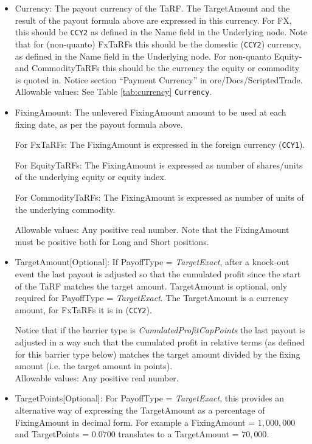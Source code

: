 \begin{itemize}
    \item Currency: The payout currency of the TaRF. The TargetAmount and the result of the payout formula above are
expressed in this currency.  For FX, this should be \lstinline!CCY2! as defined in the Name field in the Underlying node.
Note that for (non-quanto) FxTaRFs this should be the domestic (\lstinline!CCY2!) currency, as defined in the Name field in
the Underlying node. For non-quanto Equity- and CommodityTaRFs this should be the currency the equity or commodity is quoted in.
Notice section ``Payment Currency'' in ore/Docs/ScriptedTrade. \\
      Allowable values: See Table \ref{tab:currency} \lstinline!Currency!.

    \item FixingAmount: The unlevered FixingAmount amount to be used at each fixing date, as per the payout formula above.  
    
    For FxTaRFs: The FixingAmount is expressed in the foreign currency (\lstinline!CCY1!).
    
   For EquityTaRFs: The FixingAmount is expressed as number of shares/units of the underlying equity or equity index.
    
   For CommodityTaRFs: The FixingAmount is expressed as number of units of the underlying commodity.
    
      Allowable values: Any positive real number. Note that the FixingAmount must
be positive both for Long and Short positions.

    \item TargetAmount[Optional]: If PayoffType = \emph{TargetExact}, after a knock-out event the last payout is
      adjusted so that the cumulated profit since the start of the TaRF matches the target amount.  TargetAmount is
      optional, only required for PayoffType = \emph{TargetExact}. The TargetAmount is a currency amount, for FxTaRFs it
      is in (\lstinline!CCY2!).

      Notice that if the barrier type is \emph{CumulatedProfitCapPoints} the last payout is adjusted in a way such that
      the cumulated profit in relative terms (as defined for this barrier type below) matches the target amount divided
      by the fixing amount (i.e. the target amount in points). \\

      Allowable values: Any positive real number.

    \item TargetPoints[Optional]: For PayoffType = \emph{TargetExact}, this provides an alternative way of expressing
      the TargetAmount as a percentage of FixingAmount in decimal form. For example a FixingAmount = $1,000,000$ and
      TargetPoints = $0.0700$ translates to a TargetAmount = $70,000$. \\


\end{itemize}
